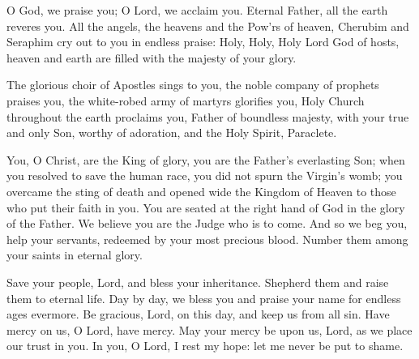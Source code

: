 
O God, we praise you; O Lord, we acclaim you.
Eternal Father, all the earth reveres you.
All the angels, the heavens and the Pow’rs of heaven,
Cherubim and Seraphim cry out to you in endless praise:
Holy, Holy, Holy Lord God of hosts,
heaven and earth are filled with the majesty of your glory.

The glorious choir of Apostles sings to you,
the noble company of prophets praises you,
the white-robed army of martyrs glorifies you,
Holy Church throughout the earth proclaims you,
Father of boundless majesty,
with your true and only Son,
worthy of adoration, and the Holy Spirit, Paraclete.

You, O Christ, are the King of glory,
you are the Father’s everlasting Son;
when you resolved to save the human race, 
you did not spurn the Virgin’s womb;
you overcame the sting of death
and opened wide the Kingdom of Heaven
to those who put their faith in you.
You are seated at the right hand of God
in the glory of the Father.
We believe you are the Judge who is to come. 
And so we beg you, help your servants,
redeemed by your most precious blood.
Number them among your saints in eternal glory.

Save your people, Lord, and bless your inheritance.
Shepherd them and raise them to eternal life.
Day by day, we bless you
and praise your name for endless ages evermore.
Be gracious, Lord, on this day, and keep us from all sin.
Have mercy on us, O Lord, have mercy.
May your mercy be upon us, Lord,
as we place our trust in you.
In you, O Lord, I rest my hope:
let me never be put to shame.
